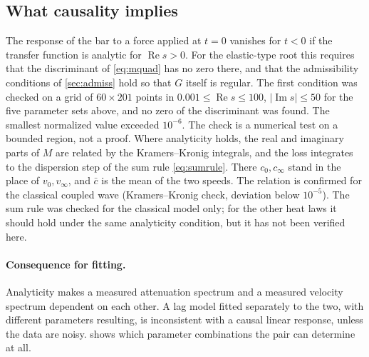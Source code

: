 \subsection{What causality implies}
The response of the bar to a force applied at $t=0$ vanishes for $t<0$ if the transfer function is analytic for $\operatorname{Re}s>0$. For the elastic-type root this requires that the discriminant of \eqref{eq:mquad} has no zero there, and that the admissibility conditions of \cref{sec:admiss} hold so that $G$ itself is regular. The first condition was checked on a grid of $60\times201$ points in $0.001\le\operatorname{Re}s\le100$, $|\operatorname{Im}s|\le50$ for the five parameter sets above, and no zero of the discriminant was found. The smallest normalized value exceeded $10^{-6}$. The check is a numerical test on a bounded region, not a proof. Where analyticity holds, the real and imaginary parts of $M$ are related by the Kramers--Kronig integrals, and the loss integrates to the dispersion step of the sum rule \eqref{eq:sumrule}. There $c_0,c_\infty$ stand in the place of $v_0,v_\infty$, and $\bar c$ is the mean of the two speeds. The relation is confirmed for the classical coupled wave (Kramers--Kronig check, deviation below $10^{-5}$). The sum rule was checked for the classical model only; for the other heat laws it should hold under the same analyticity condition, but it has not been verified here.

\paragraph{Consequence for fitting.} Analyticity makes a measured attenuation spectrum and a measured velocity spectrum dependent on each other. A lag model fitted separately to the two, with different parameters resulting, is inconsistent with a causal linear response, unless the data are noisy.  shows which parameter combinations the pair can determine at all.
